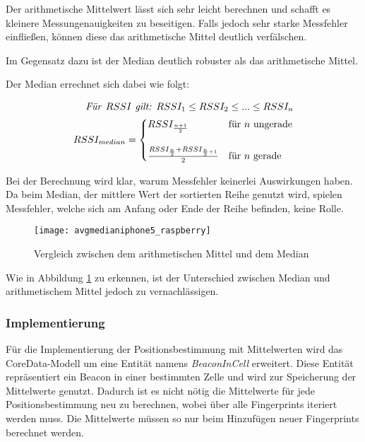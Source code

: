 Der arithmetische Mittelwert lässt sich sehr leicht berechnen und schafft es kleinere Messungenauigkeiten zu beseitigen. Falls jedoch sehr starke Messfehler einfließen, können diese das arithmetische Mittel deutlich verfälschen.

Im Gegensatz dazu ist der Median deutlich robuster als das arithmetische Mittel.

Der Median errechnet sich dabei wie folgt: 

\begin{equation}
	\begin{split}
	\text{\emph{Für }}RSSI \text{\emph{ gilt: }} RSSI_{1} \leq RSSI_{2} \leq ... \leq RSSI_{n} \\
	RSSI_{median}=\begin{cases}
	RSSI_{\frac{n+1}{2}} & \text{für } n \text{ ungerade}\\ \\
	\frac{RSSI_{\frac{n}{2}} + RSSI_{\frac{n}{2}+1}}{2} & \text{für } n \text{ gerade} \\
	\end{cases}
	\end{split}
\end{equation}

Bei der Berechnung wird klar, warum Messfehler keinerlei Auswirkungen haben. Da beim Median, der mittlere Wert der sortierten Reihe genutzt wird, spielen Messfehler, welche sich am Anfang oder Ende der Reihe befinden, keine Rolle.

\begin{figure}[htb!]
		\centering
	\texttt{[image: avgmedianiphone5\_raspberry]}
	\caption{Vergleich zwischen dem arithmetischen Mittel und dem Median}
	\label{avgmedianiphone5_raspberry}
\end{figure}

Wie in Abbildung \ref{avgmedianiphone5_raspberry} zu erkennen, ist der Unterschied zwischen Median und arithmetischem Mittel jedoch zu vernachlässigen. 

\subsubsection{Implementierung}
\label{sec:implementation:fingerprinting:positioning:avg:implementiation}
Für die Implementierung der Positionsbestimmung mit Mittelwerten wird das CoreData-Modell um eine Entität namens \emph{BeaconInCell} erweitert. Diese Entität repräsentiert ein Beacon in einer bestimmten Zelle und wird zur Speicherung der Mittelwerte genutzt. Dadurch ist es nicht nötig die Mittelwerte für jede Positionsbestimmung neu zu berechnen, wobei über alle Fingerprints iteriert werden muss. Die Mittelwerte müssen so nur beim Hinzufügen neuer Fingerprints berechnet werden.




